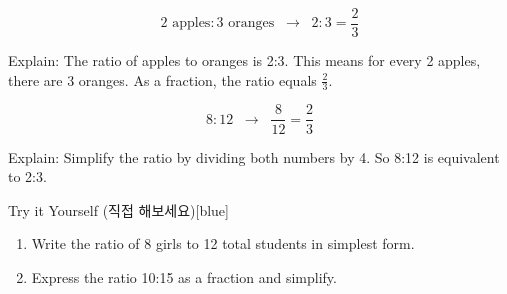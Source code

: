 \documentclass[12pt]{book}
\begin{document}
\[
2 \text{ apples} : 3 \text{ oranges} \;\;\rightarrow\;\; 2:3 = \dfrac{2}{3}
\]

Explain: The ratio of apples to oranges is 2:3.  
This means for every 2 apples, there are 3 oranges.  
As a fraction, the ratio equals $\tfrac{2}{3}$.



\[
8:12 \;\;\rightarrow\;\; \dfrac{8}{12} = \dfrac{2}{3}
\]

Explain: Simplify the ratio by dividing both numbers by 4.  
So 8:12 is equivalent to 2:3.

\begin{flexbox}{Try it Yourself (직접 해보세요)}[blue]
\begin{enumerate}
  \item Write the ratio of 8 girls to 12 total students in simplest form. \vspace*{20pt}
  \item Express the ratio 10:15 as a fraction and simplify. \vspace*{20pt}
\end{enumerate}
\end{flexbox}

  
  
  
  
  
  
  
  
  
  
\end{document}
